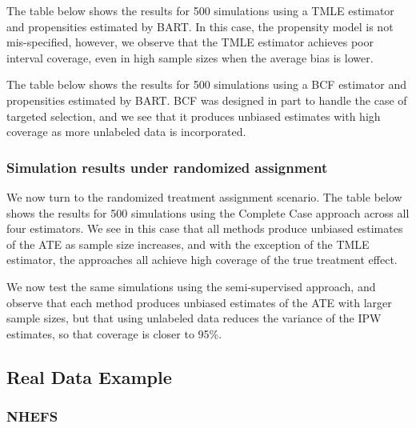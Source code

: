\documentclass[aos]{imsart}
\begin{document}


The table below shows the results for 500 simulations using a TMLE estimator and propensities 
estimated by BART. In this case, the propensity model is not mis-specified, however, we observe 
that the TMLE estimator achieves poor interval coverage, even in high sample sizes when the 
average bias is lower.



The table below shows the results for 500 simulations using a BCF estimator and propensities 
estimated by BART. BCF was designed in part to handle the case of targeted selection, and we 
see that it produces unbiased estimates with high coverage as more unlabeled data is incorporated.



\subsubsection{Simulation results under randomized assignment}

We now turn to the randomized treatment assignment scenario. 
The table below shows the results for 500 simulations using the Complete Case approach 
across all four estimators. We see in this case that all methods produce unbiased estimates 
of the ATE as sample size increases, and with the exception of the TMLE estimator, the approaches 
all achieve high coverage of the true treatment effect.



We now test the same simulations using the semi-supervised approach, and observe that 
each method produces unbiased estimates of the ATE with larger sample sizes, but that using 
unlabeled data reduces the variance of the IPW estimates, so that coverage is closer to 95\%.



\subsection{Real Data Example}

\subsubsection{NHEFS}
\end{document}
